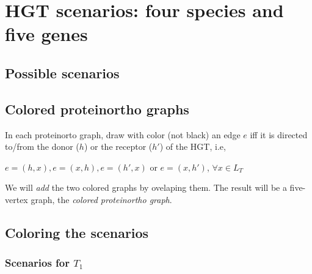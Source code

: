 \documentclass[10pt,a4paper,notitlepage]{article}
\begin{document}
\section{HGT scenarios: four species and five genes}	

\subsection{Possible scenarios}


\subsection{Colored proteinortho graphs}
In each proteinorto graph, draw with color (not black) an edge $e$ iff it is directed to/from the donor ($h$) or the receptor ($h'$) of the HGT, i.e, 
		\begin{center}
			 $e=(h,x),e=(x,h),e=(h',x)$ or $e=(x,h')$, $\forall x\in L_T$\\
		\end{center}

We will \textit{add} the two colored graphs by ovelaping them. The result will be a five-vertex graph, the \textit{colored proteinortho graph}.


\subsection{Coloring the scenarios}
	\subsubsection{Scenarios for $T_1$}
\end{document}

